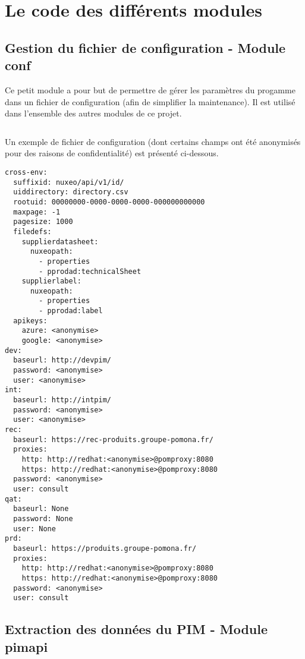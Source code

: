 \documentclass{report}
\begin{document}
    \chapter{Le code des différents modules}

    \section{Gestion du fichier de configuration - Module conf}
    \label{code:conf}
    Ce petit module a pour but de permettre de gérer les paramètres du progamme dans un fichier de configuration (afin de simplifier la maintenance).
    Il est utilisé dans l'ensemble des autres modules de ce projet.

    \begin{multicols}{2}
    \begin{spacing}{1.0}
        \inputminted[fontsize=\tiny]{python}{../src/conf.py}
    \end{spacing}
    \end{multicols}

    Un exemple de fichier de configuration (dont certains champs ont été anonymisés pour des raisons de confidentialité) est présenté ci-dessous.

    \begin{verbatim}
cross-env:
  suffixid: nuxeo/api/v1/id/
  uiddirectory: directory.csv
  rootuid: 00000000-0000-0000-0000-000000000000
  maxpage: -1
  pagesize: 1000
  filedefs: 
    supplierdatasheet:
      nuxeopath: 
        - properties
        - pprodad:technicalSheet
    supplierlabel:
      nuxeopath: 
        - properties
        - pprodad:label
  apikeys:
    azure: <anonymise>
    google: <anonymise>
dev:
  baseurl: http://devpim/
  password: <anonymise>
  user: <anonymise>
int:
  baseurl: http://intpim/
  password: <anonymise>
  user: <anonymise>
rec:
  baseurl: https://rec-produits.groupe-pomona.fr/
  proxies:
    http: http://redhat:<anonymise>@pomproxy:8080
    https: http://redhat:<anonymise>@pomproxy:8080  
  password: <anonymise>
  user: consult
qat:
  baseurl: None
  password: None
  user: None
prd:
  baseurl: https://produits.groupe-pomona.fr/
  proxies:
    http: http://redhat:<anonymise>@pomproxy:8080
    https: http://redhat:<anonymise>@pomproxy:8080
  password: <anonymise>
  user: consult
\end{verbatim}

    \section{Extraction des données du PIM - Module pimapi}
    \label{code:pimapi}
    \begin{multicols}{2}
    \begin{spacing}{1.0}
    \inputminted[fontsize=\tiny]{python}{../src/pimapi.py}
    \end{spacing}
    \end{multicols}
\end{document}
